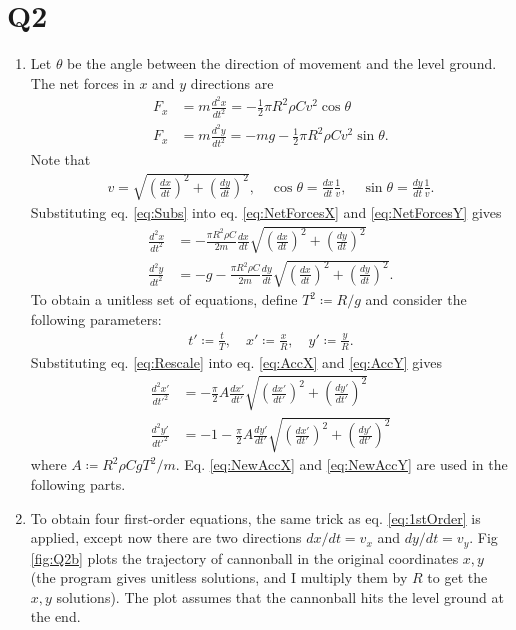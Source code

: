 \documentclass[11pt]{article}
\begin{document}
\section*{Q2}
\begin{enumerate}[label=\alph*)]
    \item Let $\theta$ be the angle between the direction of movement and the level ground. The net forces in $x$ and $y$ directions are
    \begin{align}
        F_x&=m\frac{d^2x}{dt^2}=-\frac{1}{2}\pi R^2\rho Cv^2\cos{\theta}
        \label{eq:NetForcesX}\\
        F_x&=m\frac{d^2y}{dt^2}=-mg-\frac{1}{2}\pi R^2\rho Cv^2\sin{\theta}.
        \label{eq:NetForcesY}
    \end{align}
    Note that
    \begin{align}
        v=\sqrt{(\frac{dx}{dt})^2+(\frac{dy}{dt})^2},\quad \cos{\theta}=\frac{dx}{dt}\frac{1}{v},\quad \sin{\theta}=\frac{dy}{dt}\frac{1}{v}.
        \label{eq:Subs}
    \end{align}
    Substituting eq. \ref{eq:Subs} into eq. \ref{eq:NetForcesX} and \ref{eq:NetForcesY} gives
    \begin{align}
        \frac{d^2x}{dt^2}&=-\frac{\pi R^2\rho C}{2m}\frac{dx}{dt}\sqrt{(\frac{dx}{dt})^2+(\frac{dy}{dt})^2}
        \label{eq:AccX}\\
        \frac{d^2y}{dt^2}&=-g-\frac{\pi R^2\rho C}{2m}\frac{dy}{dt}\sqrt{(\frac{dx}{dt})^2+(\frac{dy}{dt})^2}.
        \label{eq:AccY}
    \end{align}
    To obtain a unitless set of equations, define $T^2\coloneqq R/g$ and consider the following parameters:
    \begin{align}
        t'\coloneqq\frac{t}{T},\quad x'\coloneqq\frac{x}{R},\quad y'\coloneqq\frac{y}{R}.
        \label{eq:Rescale}
    \end{align}
    Substituting eq. \ref{eq:Rescale} into eq. \ref{eq:AccX} and \ref{eq:AccY} gives
    \begin{align}
        \frac{d^2x'}{dt'^2}&=-\frac{\pi}{2}A\frac{dx'}{dt'}\sqrt{(\frac{dx'}{dt'})^2+(\frac{dy'}{dt'})^2}
        \label{eq:NewAccX}\\
        \frac{d^2y'}{dt'^2}&=-1-\frac{\pi}{2}A\frac{dy'}{dt'}\sqrt{(\frac{dx'}{dt'})^2+(\frac{dy'}{dt'})^2}
        \label{eq:NewAccY}
    \end{align}
    where $A\coloneqq R^2\rho CgT^2/m$. Eq. \ref{eq:NewAccX} and \ref{eq:NewAccY} are used in the following parts.
    \item To obtain four first-order equations, the same trick as eq. \ref{eq:1stOrder} is applied, except now there are two directions $dx/dt=v_x$ and $dy/dt=v_y$. Fig \ref{fig:Q2b} plots the trajectory of cannonball in the original coordinates $x,y$ (the program gives unitless solutions, and I multiply them by $R$ to get the $x,y$ solutions). The plot assumes that the cannonball hits the level ground at the end.

\end{enumerate}
\end{document}
